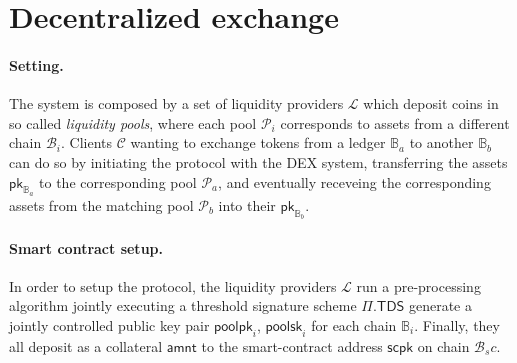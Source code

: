 
\section{Decentralized exchange}

\paragraph*{Setting.} The system is composed by a set of liquidity providers $\mathcal{L}$ which deposit coins in so called \textit{liquidity pools}, where each pool $\mathcal{P}_i$ corresponds to assets from a different chain $\mathcal{B}_i$.  Clients $\mathcal{C}$ wanting to exchange tokens from a ledger $\mathbb{B}_a$ to another $\mathbb{B}_b$ can do so by initiating the protocol with the DEX system, transferring the assets $\mathsf{pk}_{\mathbb{B}_a}$ to the corresponding pool $\mathcal{P}_a$, and eventually receveing the corresponding assets from the matching pool $\mathcal{P}_b$ into their $\mathsf{pk}_{\mathbb{B}_b}$.

\paragraph*{Smart contract setup.}
In order to setup the protocol, the liquidity providers $\mathcal{L}$ run a pre-processing algorithm jointly executing a threshold signature scheme $\Pi.\mathsf{TDS}$ generate a jointly controlled public key pair $\mathsf{poolpk}_i$, $\mathsf{poolsk}_i$ for each chain $\mathbb{B}_i$.  
Finally, they all deposit as a collateral $\mathsf{amnt}$ to the smart-contract address $\mathsf{scpk}$ on chain $\mathcal{B}_sc$.
